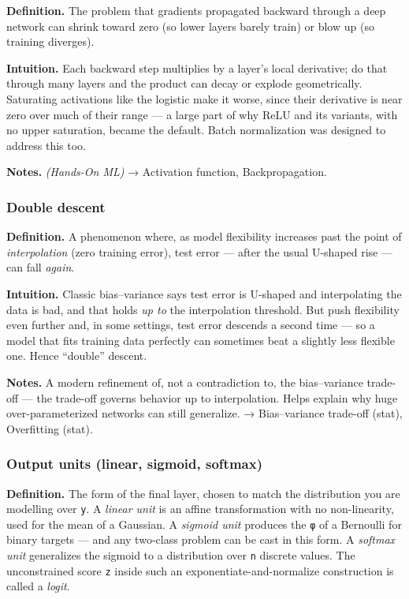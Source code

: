 \documentclass[
  10pt,
  letterpaper,
  onecolumn]{article}
\begin{document}
\textbf{Definition.} The problem that gradients propagated backward
through a deep network can shrink toward zero (so lower layers barely
train) or blow up (so training diverges).

\textbf{Intuition.} Each backward step multiplies by a layer's local
derivative; do that through many layers and the product can decay or
explode geometrically. Saturating activations like the logistic make it
worse, since their derivative is near zero over much of their range ---
a large part of why ReLU and its variants, with no upper saturation,
became the default. Batch normalization was designed to address this
too.

\textbf{Notes.} \emph{(Hands-On ML)} → Activation function,
Backpropagation.

\hypertarget{double-descent}{%
\subsubsection{Double descent}\label{double-descent}}

\textbf{Definition.} A phenomenon where, as model flexibility increases
past the point of \emph{interpolation} (zero training error), test error
--- after the usual U-shaped rise --- can fall \emph{again}.

\textbf{Intuition.} Classic bias--variance says test error is U-shaped
and interpolating the data is bad, and that holds \emph{up to} the
interpolation threshold. But push flexibility even further and, in some
settings, test error descends a second time --- so a model that fits
training data perfectly can sometimes beat a slightly less flexible one.
Hence ``double'' descent.

\textbf{Notes.} A modern refinement of, not a contradiction to, the
bias--variance trade-off --- the trade-off governs behavior up to
interpolation. Helps explain why huge over-parameterized networks can
still generalize. → Bias--variance trade-off (stat), Overfitting (stat).

\hypertarget{output-units-linear-sigmoid-softmax}{%
\subsubsection{Output units (linear, sigmoid,
softmax)}\label{output-units-linear-sigmoid-softmax}}

\textbf{Definition.} The form of the final layer, chosen to match the
distribution you are modelling over \texttt{y}. A \emph{linear unit} is
an affine transformation with no non-linearity, used for the mean of a
Gaussian. A \emph{sigmoid unit} produces the \texttt{φ} of a Bernoulli
for binary targets --- and any two-class problem can be cast in this
form. A \emph{softmax unit} generalizes the sigmoid to a distribution
over \texttt{n} discrete values. The unconstrained score \texttt{z}
inside such an exponentiate-and-normalize construction is called a
\emph{logit}.
\end{document}
